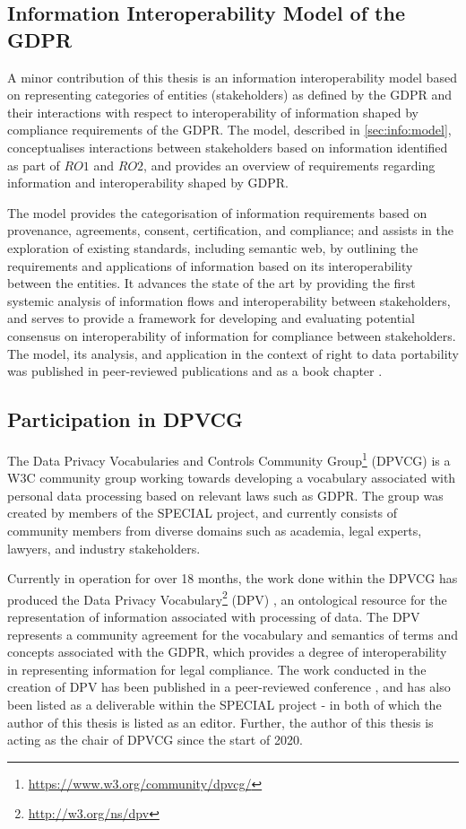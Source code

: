 \subsection{Information Interoperability Model of the GDPR}
A minor contribution of this thesis is an information interoperability model based on representing categories of entities (stakeholders) as defined by the GDPR and their interactions with respect to interoperability of information shaped by compliance requirements of the GDPR.
The model, described in \autoref{sec:info:model}, conceptualises interactions between stakeholders based on information identified as part of $RO1$ and $RO2$, and provides an overview of requirements regarding information and interoperability shaped by GDPR.

The model provides the categorisation of information requirements based on provenance, agreements, consent, certification, and compliance; and assists in the exploration of existing standards, including semantic web, by outlining the requirements and applications of information based on its interoperability between the entities.
It advances the state of the art by providing the first systemic analysis of information flows and interoperability between stakeholders, and serves to provide a framework for developing and evaluating potential consensus on interoperability of information for compliance between stakeholders.
The model, its analysis, and application in the context of right to data portability was published in peer-reviewed publications \cite{pandit_modelling_2017,pandit_exploration_2018} and as a book chapter \cite{pandit_standardisation_2020}.

\subsection{Participation in DPVCG}\label{sec:intro:dpvcg}
The Data Privacy Vocabularies and Controls Community Group\footnote{\url{https://www.w3.org/community/dpvcg/}} (DPVCG) is a W3C community group working towards developing a vocabulary associated with personal data processing based on relevant laws such as GDPR.
The group was created by members of the SPECIAL project, and currently consists of community members from diverse domains such as academia, legal experts, lawyers, and industry stakeholders.

Currently in operation for over 18 months, the work done within the DPVCG has produced the Data Privacy Vocabulary\footnote{\url{http://w3.org/ns/dpv}} (DPV) , an ontological resource for the representation of information associated with processing of data.
The DPV represents a community agreement for the vocabulary and semantics of terms and concepts associated with the GDPR, which provides a degree of interoperability in representing information for legal compliance.
The work conducted in the creation of DPV has been published in a peer-reviewed conference \cite{pandit_dpv_2019}, and has also been listed as a deliverable within the SPECIAL project \cite{pandit_d6.5_2019} - in both of which the author of this thesis is listed as an editor.
Further, the author of this thesis is acting as the chair of DPVCG since the start of 2020.

